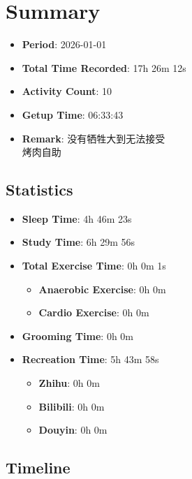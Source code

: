 \documentclass[12pt]{extarticle}
\begin{document}
{\fontsize{18}{21.6}\selectfont\section*{Summary}}

\begin{itemize}[topsep=0pt, itemsep=-0.5ex]
    \item \textbf{Period}: 2026-01-01
    \item \textbf{Total Time Recorded}: 17h 26m 12s
    \item \textbf{Activity Count}: 10
    \item \textbf{Getup Time}: 06:33:43
    \item \textbf{Remark}: 没有牺牲大到无法接受\\
烤肉自助
\end{itemize}

{ \fontsize{16}{19}\selectfont \subsection*{Statistics}}

\begin{itemize}[topsep=0pt, itemsep=-0.5ex]
    \item \textbf{Sleep Time}: 4h 46m 23s
    \item \textbf{Study Time}: 6h 29m 56s
    \item \textbf{Total Exercise Time}: 0h 0m 1s
    \begin{itemize}[topsep=0pt, itemsep=-0.5ex]
        \item \textbf{Anaerobic Exercise}: 0h 0m
        \item \textbf{Cardio Exercise}: 0h 0m
    \end{itemize}
    \item \textbf{Grooming Time}: 0h 0m
    \item \textbf{Recreation Time}: 5h 43m 58s
    \begin{itemize}[topsep=0pt, itemsep=-0.5ex]
        \item \textbf{Zhihu}: 0h 0m
        \item \textbf{Bilibili}: 0h 0m
        \item \textbf{Douyin}: 0h 0m
    \end{itemize}
\end{itemize}

{\fontsize{16}{19.2}\selectfont\subsection*{Timeline}}
\end{document}
